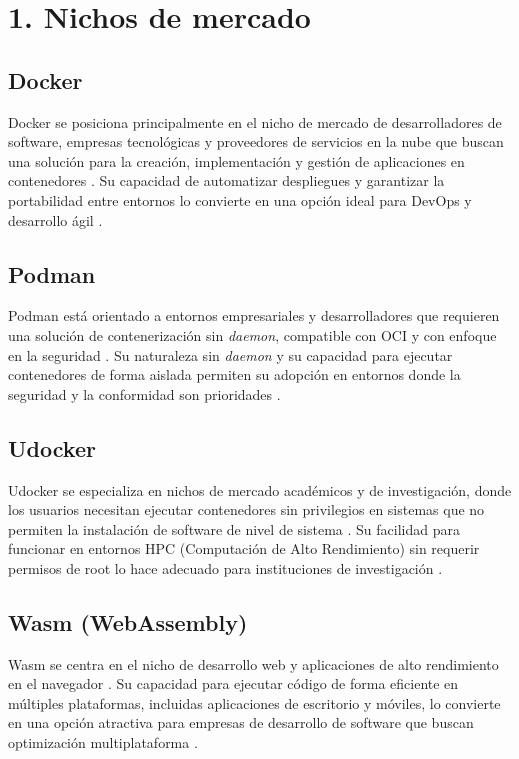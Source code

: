 \section*{1. Nichos de mercado}

\subsection*{Docker}
Docker se posiciona principalmente en el nicho de mercado de desarrolladores de software, empresas tecnológicas y proveedores de servicios en la nube que buscan una solución para la creación, implementación y gestión de aplicaciones en contenedores \citep{Hill2025}. Su capacidad de automatizar despliegues y garantizar la portabilidad entre entornos lo convierte en una opción ideal para DevOps y desarrollo ágil \citep{Mag2025}.

\subsection*{Podman}
Podman está orientado a entornos empresariales y desarrolladores que requieren una solución de contenerización sin \textit{daemon}, compatible con OCI y con enfoque en la seguridad \citep{Surendhar2024}. Su naturaleza sin \textit{daemon} y su capacidad para ejecutar contenedores de forma aislada permiten su adopción en entornos donde la seguridad y la conformidad son prioridades \citep{Trevor2022}.

\subsection*{Udocker}
Udocker se especializa en nichos de mercado académicos y de investigación, donde los usuarios necesitan ejecutar contenedores sin privilegios en sistemas que no permiten la instalación de software de nivel de sistema \citep{Campos2017}. Su facilidad para funcionar en entornos HPC (Computación de Alto Rendimiento) sin requerir permisos de root lo hace adecuado para instituciones de investigación \citep{Gomes2018}.

\subsection*{Wasm (WebAssembly)}
Wasm se centra en el nicho de desarrollo web y aplicaciones de alto rendimiento en el navegador \citep{Haas2017}. Su capacidad para ejecutar código de forma eficiente en múltiples plataformas, incluidas aplicaciones de escritorio y móviles, lo convierte en una opción atractiva para empresas de desarrollo de software que buscan optimización multiplataforma \citep{Jangda2019}.

